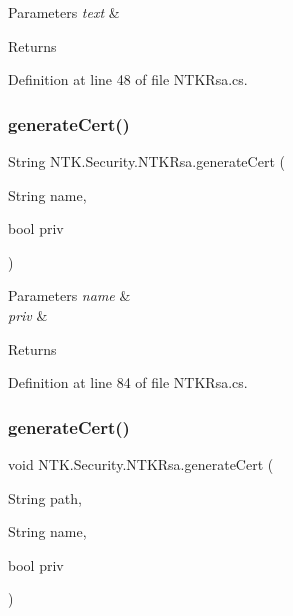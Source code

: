 \begin{DoxyParams}{Parameters}
{\em text} & \\
\hline
\end{DoxyParams}
\begin{DoxyReturn}{Returns}

\end{DoxyReturn}


Definition at line 48 of file N\+T\+K\+Rsa.\+cs.

\mbox{\label{class_n_t_k_1_1_security_1_1_n_t_k_rsa_a2b527b5144ec43b8616cbfbb33f8b0e0}} 
\subsubsection{\texorpdfstring{generateCert()}{generateCert()}\hspace{0.1cm}{\footnotesize\ttfamily [1/2]}}
{\footnotesize\ttfamily String N\+T\+K.\+Security.\+N\+T\+K\+Rsa.\+generate\+Cert (\begin{DoxyParamCaption}\item[{String}]{name,  }\item[{bool}]{priv }\end{DoxyParamCaption})}






\begin{DoxyParams}{Parameters}
{\em name} & \\
\hline
{\em priv} & \\
\hline
\end{DoxyParams}
\begin{DoxyReturn}{Returns}

\end{DoxyReturn}


Definition at line 84 of file N\+T\+K\+Rsa.\+cs.

\mbox{\label{class_n_t_k_1_1_security_1_1_n_t_k_rsa_abfa79fc246f10de191a6885832446659}} 
\subsubsection{\texorpdfstring{generateCert()}{generateCert()}\hspace{0.1cm}{\footnotesize\ttfamily [2/2]}}
{\footnotesize\ttfamily void N\+T\+K.\+Security.\+N\+T\+K\+Rsa.\+generate\+Cert (\begin{DoxyParamCaption}\item[{String}]{path,  }\item[{String}]{name,  }\item[{bool}]{priv }\end{DoxyParamCaption})}






